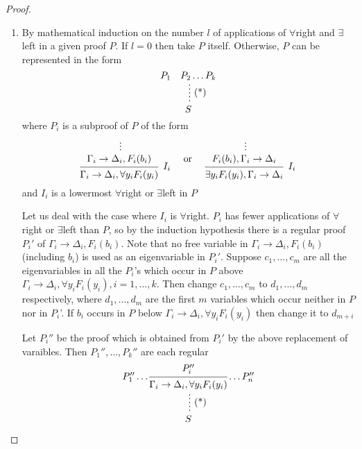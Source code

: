 \documentclass[11pt]{article}
\begin{document}
\begin{proof}
\begin{enumerate}
\item By mathematical induction on the number \(l\) of applications of
\(\forall\)right and \(\exists\)left in a given proof \(P\). If \(l=0\)
then take \(P\) itself. Otherwise, \(P\) can be represented in the form
\begin{equation*}
\begin{prooftree}%
\hypo{P_1\quad P_2\dots P_k}
\ellipsis{(*)}{S}
\end{prooftree}
\end{equation*}
where \(P_i\) is a subproof of \(P\) of the form
\begin{equation*}
\begin{prooftree}%
\hypo{}
\ellipsis{}{\Gamma_i\to\Delta_i,F_i(b_i)}
\infer1[\(I_i\)]{\Gamma_i\to\Delta_i,\forall y_iF_i(y_i)}
\end{prooftree}
\quad\text{ or }\quad
\begin{prooftree}%
\hypo{}
\ellipsis{}{F_i(b_i),\Gamma_i\to\Delta_i}
\infer1[\(I_i\)]{\exists y_iF_i(y_i),\Gamma_i\to\Delta_i}
\end{prooftree}      
\end{equation*}
and \(I_i\) is a lowermost \(\forall\)right or \(\exists\)left in \(P\)

Let us deal with the case where \(I_i\) is \(\forall\)right. \(P_i\) has
fewer applications of \(\forall\)right or \(\exists\)left than \(P\), so
by the induction hypothesis there is a regular proof \(P_i'\) of
\(\Gamma_i\to\Delta_i,F_i(b_i)\). Note that no free variable in
\(\Gamma_i\to\Delta_i,F_i(b_i)\) (including \(b_i\)) is used as an
eigenvariable in \(P_i'\). Suppose \(c_1,\dots,c_m\) are all the
eigenvariables in all the \(P_i\)'s which occur in \(P\) above
\(\Gamma_i\to\Delta_i,\forall y_iF_i(y_i), i=1,\dots,k\). Then change
\(c_1,\dots,c_m\) to \(d_1,\dots,d_m\) respectively, where
\(d_1,\dots,d_m\) are the first \(m\) variables which occur neither in
\(P\) nor in \(P_i\)'. If \(b_i\) occurs in \(P\) below
\(\Gamma_i\to\Delta_i,\forall y_iF_i(y_i)\) then change it to \(d_{m+i}\)

Let \(P_i''\) be the proof which is obtained from \(P_i'\) by the above
replacement of varaibles. Then \(P_1'',\dots,P_k''\) are each regular
\begin{equation*}
\begin{prooftree}%
\hypo{P_1''\dots
\begin{prooftree}%
\hypo{P_i''}
\infer1{\Gamma_i\to\Delta_i,\forall y_iF_i(y_i)}
\end{prooftree}\dots P_n''}
\ellipsis{(*)}{S}
\end{prooftree}
\end{equation*}
\end{enumerate}
\end{proof}
\end{document}
